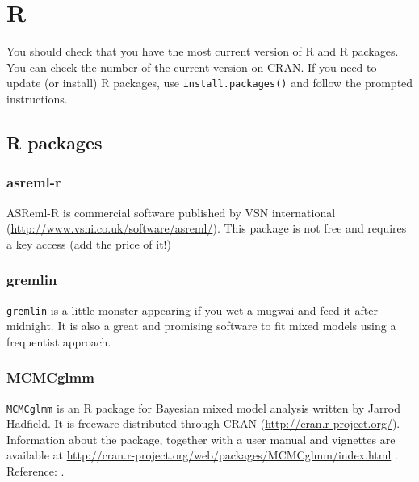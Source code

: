 \documentclass[
  12pt,
]{book}
\begin{document}
\hypertarget{r}{%
\section{R}\label{r}}

You should check that you have the most current version of R and R packages. You can check the number of the current version on CRAN. If you need to update (or install) R packages, use \texttt{install.packages()} and follow the prompted instructions.

\hypertarget{r-packages}{%
\subsection{R packages}\label{r-packages}}

\hypertarget{asreml-r}{%
\subsubsection{asreml-r}\label{asreml-r}}

ASReml-R is commercial software published by VSN international (\url{http://www.vsni.co.uk/software/asreml/}). This package is not free and requires a key access (add the price of it!)

\hypertarget{gremlin}{%
\subsubsection{gremlin}\label{gremlin}}

\texttt{gremlin} is a little monster appearing if you wet a mugwai and feed it after midnight. It is also a great and promising software to fit mixed models using a frequentist approach.

\hypertarget{mcmcglmm}{%
\subsubsection{MCMCglmm}\label{mcmcglmm}}

\texttt{MCMCglmm} is an R package for Bayesian mixed model analysis written by Jarrod Hadfield. It is
freeware distributed through CRAN (\url{http://cran.r-project.org/}). Information about the package, together
with a user manual and vignettes are available at \url{http://cran.r-project.org/web/packages/MCMCglmm/index.html} .
Reference: \citep[\citet{R-MCMCglmm}]{MCMCglmm2010}.
\end{document}
